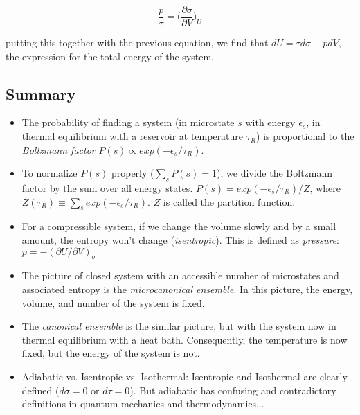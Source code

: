 \begin{equation}
\frac{p}{\tau} = \bigg(\frac{\partial \sigma}{\partial V}\bigg)_{U}
\end{equation}

putting this together with the previous equation, we find that
$dU = \tau d\sigma - p dV$, the expression for the total energy of
the system.


\subsection{Summary}
\begin{itemize}
\item The probability of finding a system (in microstate $s$ with
	energy $\epsilon_s$, in thermal equilibrium with a reservoir 
	at temperature $\tau_R$) is proportional to the 
	\emph{Boltzmann factor} $P(s) \propto exp(-\epsilon_s/\tau_R)$.

\item To normalize $P(s)$ properly ($\sum_{s} P(s) = 1$), we divide
	the Boltzmann factor by the sum over all energy states.
	$P(s) = exp(-\epsilon_s/\tau_R)/Z$, where 
	$Z(\tau_R) \equiv \sum_{s} exp(-\epsilon_s/\tau_R)$. $Z$ is called the
	partition function.

\item For a compressible system, if we change the volume slowly and by
	a small amount, the entropy won't change (\textit{isentropic}). This
	is defined as \textit{pressure}: $p = -(\partial U/\partial V)_\sigma$

\item The picture of closed system with an accessible number of microstates
	and associated entropy is the \emph{microcanonical ensemble}. In this picture, the energy, volume, and number of the system is fixed.

\item The \emph{canonical ensemble} is the similar picture, but with 
	the system now in thermal equilibrium with a heat bath. Consequently,
	the temperature is now fixed, but the energy of the system is not.

\item Adiabatic vs. Isentropic vs. Isothermal: Isentropic and 
	Isothermal are clearly defined ($d\sigma = 0$ or $d\tau = 0$). But
	adiabatic has confusing and contradictory definitions in quantum
	mechanics and thermodynamics...
\end{itemize}




